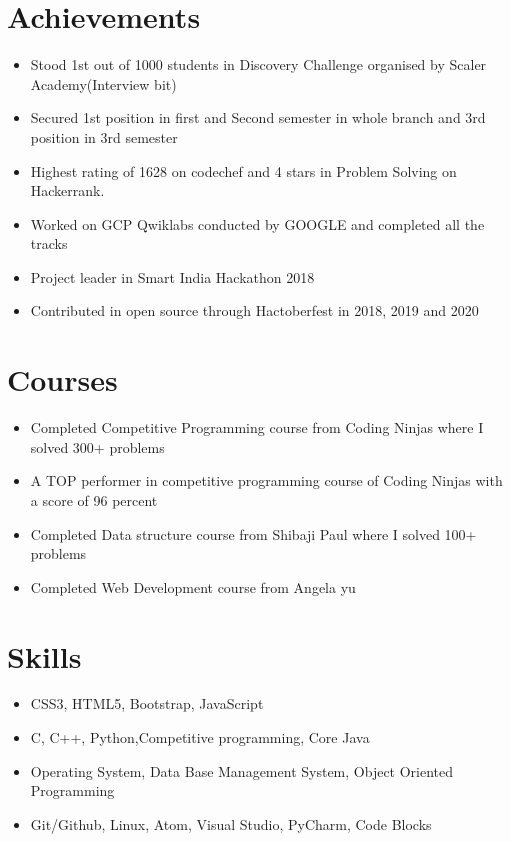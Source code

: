 \documentclass[letterpaper,11pt]{article}
\newcommand{\resumeItem}[1]{
  \item\small{
    {#1 \vspace{-2pt}}
  }
}
\newcommand{\resumeItemListStart}{\begin{itemize}}
\newcommand{\resumeItemListEnd}{\end{itemize}\vspace{-5pt}}
\begin{document}
%
\section{Achievements}
 \begin{itemize}[leftmargin=0.15in, label={}]
            \resumeItemListStart
            \resumeItem{Stood 1st out of 1000 students in Discovery Challenge organised by Scaler Academy(Interview bit)}
            
            \resumeItem{Secured 1st position in first and Second semester in whole branch and 3rd position in 3rd semester}
            
            \resumeItem{Highest rating of 1628 on codechef and 4 stars in Problem Solving on Hackerrank.}
            
            \resumeItem{Worked on GCP Qwiklabs conducted by GOOGLE and completed all the tracks}
            
            \resumeItem{Project leader in Smart India Hackathon 2018}
            
            \resumeItem{Contributed in open source through Hactoberfest in 2018, 2019 and 2020}
            
            
          \resumeItemListEnd
 \end{itemize}

\section{Courses}
 \begin{itemize}[leftmargin=0.15in, label={}]
            \resumeItemListStart
            \resumeItem{Completed Competitive Programming course from Coding Ninjas where I solved 300+ problems}
            \resumeItem{A TOP performer in competitive programming course of Coding Ninjas with a  score of 96 percent}
            \resumeItem{Completed Data structure course from Shibaji Paul where I solved 100+ problems}
            \resumeItem{Completed Web Development course from Angela yu }
            
          \resumeItemListEnd
 \end{itemize}
 
 \section{Skills}
 \begin{itemize}[leftmargin=0.15in, label={}]
            \resumeItemListStart
            \resumeItem{CSS3, HTML5, Bootstrap, JavaScript}
            \resumeItem{C, C++, Python,Competitive programming, Core Java}
            \resumeItem{Operating System, Data Base Management System, Object Oriented Programming}
            \resumeItem{Git/Github, Linux, Atom, Visual Studio, PyCharm, Code Blocks}
            
          \resumeItemListEnd
 \end{itemize}
 
\end{document}
